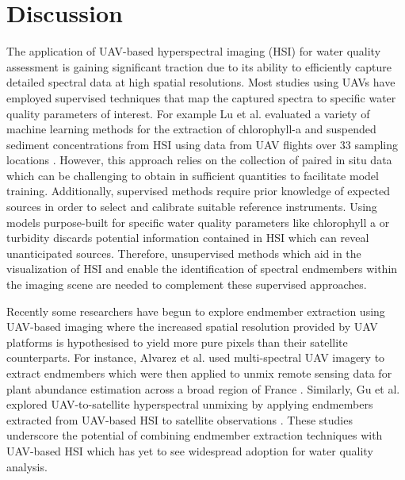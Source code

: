 \documentclass[remotesensing,article,submit,pdftex,moreauthors]{Definitions/mdpi}
\begin{document}
\section{Discussion}


The application of UAV-based hyperspectral imaging (HSI) for water quality assessment is gaining significant traction due to its ability to efficiently capture detailed spectral data at high spatial resolutions. Most studies using UAVs have employed supervised techniques that map the captured spectra to specific water quality parameters of interest. For example Lu et al. evaluated a variety of machine learning methods for the extraction of chlorophyll-a and suspended sediment concentrations from HSI using data from UAV flights over 33 sampling locations \cite{lu2021retrieval}. However, this approach relies on the collection of paired in situ data which can be challenging to obtain in sufficient quantities to facilitate model training. Additionally, supervised methods require prior knowledge of expected sources in order to select and calibrate suitable reference instruments. Using models purpose-built for specific water quality parameters like chlorophyll a or turbidity discards potential information contained in HSI which can reveal unanticipated sources. Therefore, unsupervised methods which aid in the visualization of HSI and enable the identification of spectral endmembers within the imaging scene are needed to complement these supervised approaches.

Recently some researchers have begun to explore endmember extraction using UAV-based imaging where the increased spatial resolution provided by UAV platforms is hypothesised to yield more pure pixels than their satellite counterparts. For instance, Alvarez et al. used multi-spectral UAV imagery to extract endmembers which were then applied to unmix remote sensing data for plant abundance estimation across a broad region of France \cite{alvarez2020can}. Similarly, Gu et al. explored UAV-to-satellite hyperspectral unmixing by applying endmembers extracted from UAV-based HSI to satellite observations \cite{gu2023intrinsic}. These studies underscore the potential of combining endmember extraction techniques with UAV-based HSI which has yet to see widespread adoption for water quality analysis.
\end{document}
